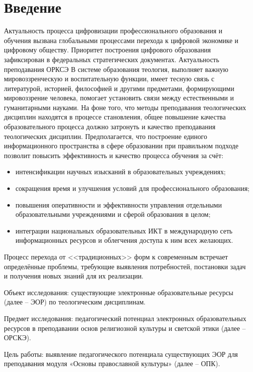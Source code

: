 \tableofcontents
\newpage
\large
\section*{Введение}
Актуальность процесса цифровизации профессионального образования и обучения вызвана глобальными процессами перехода к цифровой экономике и цифровому обществу.
Приоритет построения цифрового образования зафиксирован в федеральных стратегических документах\cite{fsd}. 
Актуальность преподавания ОРКСЭ В системе образования теология, выполняет важную мировоззренческую и воспитательную функции, имеет тесную связь с литературой, историей, философией и другими предметами, формирующими мировоззрение человека, помогает установить связи между естественными и гуманитарными науками.
На фоне того, что методы преподавания теологических дисциплин находятся в процессе становления, общее повышение качества образовательного процесса должно затронуть и качество преподавания теологических дисциплин.
Предполагается, что построение единого информационного пространства в сфере образовании при правильном подходе позволит повысить эффективность и качество процесса обучения за счёт:
\begin{itemize}
\item интенсификации научных изысканий в образовательных учреждениях;
\item сокращения время и улучшения условий для профессионального образования;
\item повышения оперативности и эффективности управления отдельными образовательными учреждениями и сферой образования в целом;
\item интеграции национальных образовательных ИКТ в международную сеть информационных ресурсов и облегчения доступа к ним всех желающих.
\end{itemize}

Процесс перехода от <<традиционных>> форм к современным встречает определённые проблемы, требующие выявления потребностей, постановки задач и получения новых знаний для их реализации.

Объект исследования: \label{obj} существующие электронные образовательные ресурсы (далее – ЭОР) по теологическим дисциплинам.

Предмет исследования: \label{subj} педагогический потенциал электронных образовательных ресурсов в преподавании основ религиозной культуры и светской этики (далее – ОРСКЭ). 

Цель работы:\label{goal}  выявление педагогического потенциала существующих ЭОР для преподавания модуля «Основы православной культуры» (далее – ОПК). 

